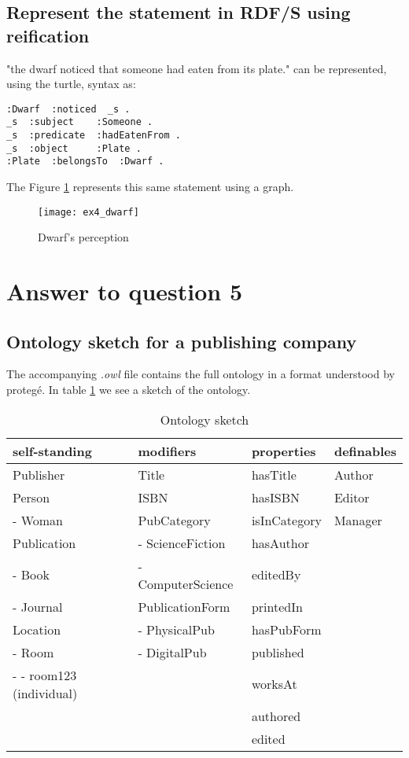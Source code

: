 \documentclass[a4paper,12pt]{article}
\begin{document}
\subsection[Dwarf]{Represent the statement in RDF/S using reification}
"the dwarf noticed that someone had eaten from its plate." can be represented,
using the turtle, syntax as:
\begin{Verbatim}[samepage=true]
:Dwarf  :noticed  _s .
_s  :subject    :Someone .
_s  :predicate  :hadEatenFrom .
_s  :object     :Plate .
:Plate  :belongsTo  :Dwarf .
\end{Verbatim}
The Figure \ref{dwarf} represents this same statement using a graph.
\begin{figure}[!htp]
\centering
\texttt{[image: ex4\_dwarf]}
\caption{Dwarf's perception}
\label{dwarf}
\end{figure}

\section[Question 5]{Answer to question 5}

\subsection[Publishing]{Ontology sketch for a publishing company}
The accompanying \emph{.owl} file contains the full ontology in a format
understood by proteg\'e.  In table \ref{sketch} we see a sketch of the
ontology.
\begin{table}[!htp]
\centering
\begin{tabular}{|l|l|l|l|}
\hline
self-standing            & modifiers         & properties   & definables \\
\hline \hline
Publisher                & Title             & hasTitle     & Author     \\
Person                   & ISBN              & hasISBN      & Editor     \\
- Woman                  & PubCategory       & isInCategory & Manager    \\
Publication              & - ScienceFiction  & hasAuthor    &\\
- Book                   & - ComputerScience & editedBy     &\\
- Journal                & PublicationForm   & printedIn    &\\
Location                 & - PhysicalPub     & hasPubForm   &\\
- Room                   & - DigitalPub      & published    &\\
- - room123 (individual) &                   & worksAt      &\\
                         &                   & authored     &\\
                         &                   & edited       &\\
\hline
\end{tabular}
\caption{Ontology sketch}
\label{sketch}
\end{table}
\end{document}
